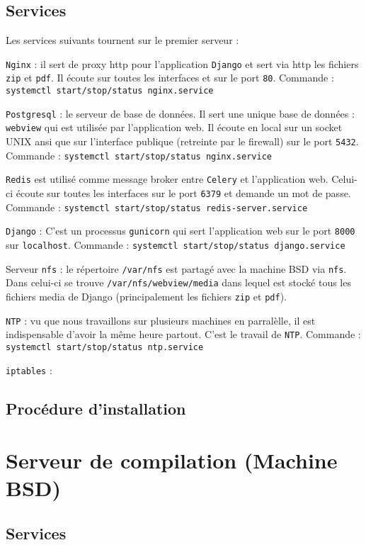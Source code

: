 \documentclass[10pt,a4paper]{article}
\begin{document}
\subsection{Services}
Les services suivants tournent sur le premier serveur :

\texttt{Nginx} : il sert de proxy http pour l'application \texttt{Django} et sert via http les fichiers \texttt{zip} et \texttt{pdf}.
Il écoute sur toutes les interfaces et sur le port \texttt{80}.
Commande : \texttt{systemctl start/stop/status nginx.service}

\texttt{Postgresql} : le serveur de base de données.
Il sert une unique base de données : \texttt{webview} qui est utilisée par l'application web.
Il écoute en local sur un socket UNIX ansi que sur l'interface publique (retreinte par le firewall) sur le port \texttt{5432}.
Commande : \texttt{systemctl start/stop/status nginx.service}

\texttt{Redis} est utilisé comme message broker entre \texttt{Celery} et l'application web. Celui-ci écoute sur toutes les interfaces sur le port \texttt{6379} et demande un mot de passe.
Commande : \texttt{systemctl start/stop/status redis-server.service}

\texttt{Django} : C'est un processus \texttt{gunicorn} qui sert l'application web sur le port \texttt{8000} sur \texttt{localhost}.
Commande : \texttt{systemctl start/stop/status django.service}

Serveur \texttt{nfs} : le répertoire \texttt{/var/nfs} est partagé avec la machine BSD via \texttt{nfs}.
Dans celui-ci se trouve \texttt{/var/nfs/webview/media} dans lequel est stocké tous les fichiers media de Django (principalement les fichiers \texttt{zip} et \texttt{pdf}).

\texttt{NTP} : vu que nous travaillons sur plusieurs machines en parralèlle, il est indispensable d'avoir la même heure partout.
C'est le travail de \texttt{NTP}.
Commande : \texttt{systemctl start/stop/status ntp.service}

\texttt{iptables} : %


\subsection{Procédure d'installation}


\section{Serveur de compilation (Machine BSD)}
\subsection{Services}
\end{document}
